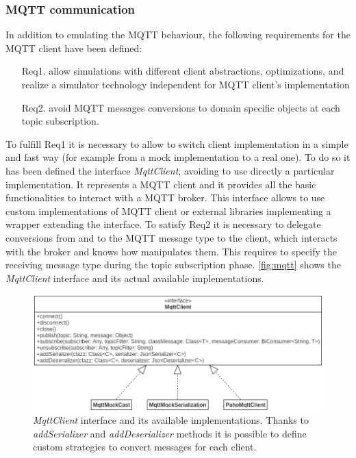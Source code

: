 \subsubsection{MQTT communication}
In addition to emulating the MQTT behaviour, the following requirements for the MQTT client have been defined:
\begin{itemize}
    \item[Req1.] allow simulations with different client abstractions, optimizations, and realize a simulator technology independent for MQTT client's implementation 
    \item[Req2.] avoid MQTT messages conversions to domain specific objects at each topic \mbox{subscription}.
\end{itemize}
To fulfill Req1 it is necessary to allow to switch client implementation in a simple and fast way (for example from a mock implementation to a real one).
To do so it has been defined the interface \mbox{\textit{MqttClient}}, avoiding to use directly a particular implementation.
It represents a MQTT client and it provides all the basic functionalities to interact with a MQTT broker. 
This interface allows to use custom implementations of MQTT client or external libraries implementing a wrapper extending the interface.
% 
To satisfy Req2 it is necessary to delegate conversions from and to the MQTT message type to the client, which interacts with the broker and knows how manipulates them. 
% 
This requires to specify the receiving message type during the topic subscription phase.
% 
\autoref{fig:mqtt} shows the \mbox{\textit{MqttClient}} interface and its actual available implementations.
\begin{figure}[h]
    \centering
    \includegraphics[width=\textwidth]{figures/mqttClient.png}
    \caption[\textit{MqttClient} interface and its available implementations]{\textit{MqttClient} interface and its available implementations. Thanks to \mbox{\textit{addSerializer}} and \mbox{\textit{addDeserializer}} methods it is possible to define custom strategies to convert messages for each client.}
    \label{fig:mqtt}
\end{figure}

